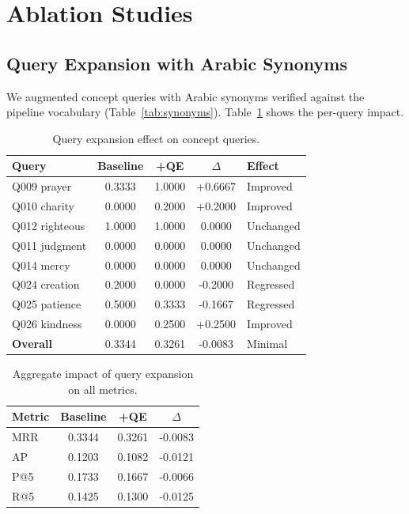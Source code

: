 \documentclass[conference]{IEEEtran}
\begin{document}
\section{Ablation Studies}

\subsection{Query Expansion with Arabic Synonyms}

We augmented concept queries with Arabic synonyms verified against the
pipeline vocabulary (Table~\ref{tab:synonyms}). Table~\ref{tab:qe}
shows the per-query impact.

\begin{table}[t]
  \centering
  \caption{Query expansion effect on concept queries.}
  \label{tab:qe}
  \footnotesize
  \begin{tabular}{lcccl}
    \toprule
    \textbf{Query} &
    \textbf{Baseline} &
    \textbf{+QE} &
    $\Delta$ &
    \textbf{Effect} \\
    \midrule
    Q009 prayer & 0.3333 & 1.0000 & +0.6667 & Improved \\
    Q010 charity & 0.0000 & 0.2000 & +0.2000 & Improved \\
    Q012 righteous & 1.0000 & 1.0000 & 0.0000 & Unchanged \\
    Q011 judgment & 0.0000 & 0.0000 & 0.0000 & Unchanged \\
    Q014 mercy & 0.0000 & 0.0000 & 0.0000 & Unchanged \\
    Q024 creation & 0.2000 & 0.0000 & -0.2000 & Regressed \\
    Q025 patience & 0.5000 & 0.3333 & -0.1667 & Regressed \\
    Q026 kindness & 0.0000 & 0.2500 & +0.2500 & Improved \\
    \midrule
    \textbf{Overall} & 0.3344 & 0.3261 & -0.0083 & Minimal \\
    \bottomrule
  \end{tabular}
\end{table}

\begin{table}[t]
  \centering
  \caption{Aggregate impact of query expansion on all metrics.}
  \label{tab:qe_agg}
  \footnotesize
  \begin{tabular}{lccc}
    \toprule
    \textbf{Metric} & \textbf{Baseline} & \textbf{+QE} & $\Delta$ \\
    \midrule
    MRR & 0.3344 & 0.3261 & -0.0083 \\
    AP  & 0.1203 & 0.1082 & -0.0121 \\
    P@5 & 0.1733 & 0.1667 & -0.0066 \\
    R@5 & 0.1425 & 0.1300 & -0.0125 \\
    \bottomrule
  \end{tabular}
\end{table}
\end{document}
